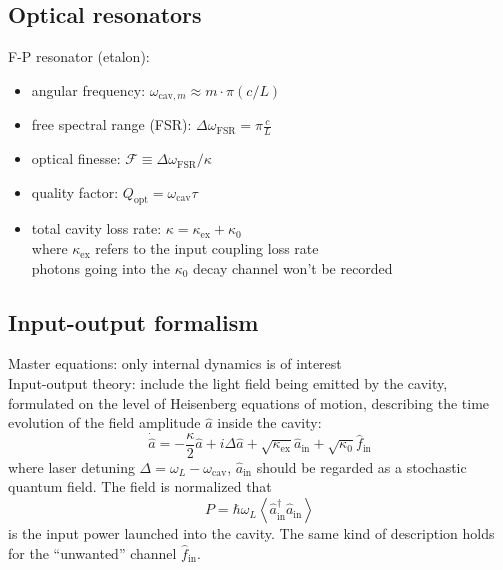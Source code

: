 \documentclass[8pt,a4paper,twocolumn]{article} %
\numberwithin{equation}{section} %
\begin{document}
		\subsection{Optical resonators} %
		\label{sub:optical_resonators}
			F-P resonator (etalon):
			\begin{itemize}
				\item angular frequency: $ \omega_{\text{cav},m}\approx m\cdot \pi(c/L) $
				\item free spectral range (FSR): $ \Delta \omega_{\text{FSR}}=\pi \frac{c}{L} $
				\item optical finesse: $\mathcal{F}\equiv\Delta \omega_{\text{FSR}}/ \kappa$
				\item quality factor: $Q_{\text{opt}}=\omega_{\text{cav}} \tau $
				\item total cavity loss rate: $ \kappa=\kappa_{\text{ex}}+\kappa_0 $\\
				where $\kappa_{\text{ex}} $ refers to the input coupling loss rate\\
				photons going into the $\kappa_0$ decay channel won't be recorded
			\end{itemize}

		\subsection{Input-output formalism} %
		\label{sub:input_output_formalism}
			
			Master equations: only internal dynamics is of interest\\
			Input-output theory: include the light field being emitted by the cavity, formulated on the level of Heisenberg equations of motion, describing the time evolution of the field amplitude $\hat{a}$ inside the cavity:
			\begin{equation}
			\label{eqt:fieldApmInCavity}
				\dot{\hat{a}}=-\frac{\kappa}{2}\hat{a}+i \Delta \hat{a} +\sqrt{\kappa_{\text{ex}}  }\hat{a}_{\text{in}}+ \sqrt{\kappa_0}\hat{f}_{\text{in}} 
			\end{equation}
			where laser detuning $\Delta=\omega_L- \omega_{\text{cav}} $, $\hat{a}_{\text{in}}$ should be regarded as a stochastic quantum field. The field is normalized that
			\begin{equation}
				P=\hbar \omega_L \left< \hat{a}_{\text{in}}^{\dagger} \hat{a}_{\text{in}} \right>
			\end{equation}
			is the input power launched into the cavity. The same kind of description holds for the ``unwanted'' channel $\hat{f}_{\text{in}} $.
\end{document}
